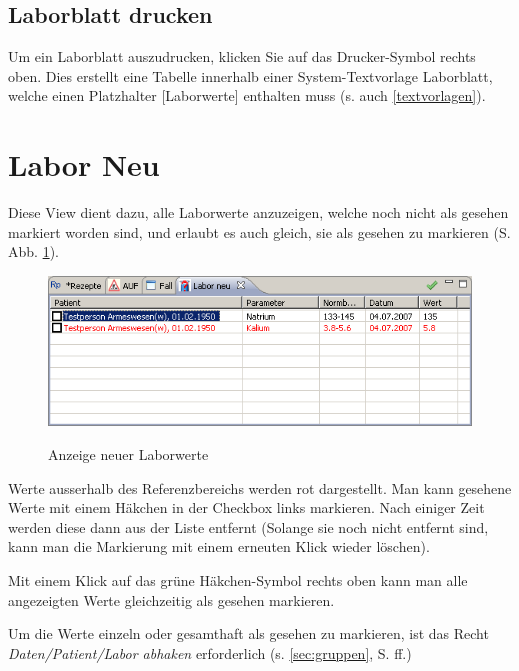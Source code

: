 \subsection{Laborblatt drucken}
Um ein Laborblatt auszudrucken, klicken Sie auf das Drucker-Symbol rechts oben. Dies erstellt eine Tabelle innerhalb einer System-Textvorlage \glqq Laborblatt\grqq{}, welche einen Platzhalter [Laborwerte] enthalten muss (s. auch \ref{textvorlagen}).

\section{Labor Neu}
Diese View dient dazu, alle Laborwerte anzuzeigen, welche noch nicht als \glqq gesehen\grqq{} markiert worden sind, und erlaubt es auch gleich, sie als gesehen zu markieren (S. Abb. \ref{fig:labneu}).

\begin{figure}
  \includegraphics{images/labneu1}\\
  \caption{Anzeige neuer Laborwerte}\label{fig:labneu}
\end{figure}

Werte ausserhalb des Referenzbereichs werden rot dargestellt. Man kann gesehene Werte mit einem Häkchen in der Checkbox links markieren. Nach einiger Zeit werden diese dann aus der Liste entfernt (Solange sie noch nicht entfernt sind, kann man die Markierung mit einem erneuten Klick wieder löschen).

Mit einem Klick auf das grüne Häkchen-Symbol rechts oben kann man alle angezeigten Werte gleichzeitig als gesehen markieren.

Um die Werte einzeln oder gesamthaft als gesehen zu markieren, ist das Recht \textit{Daten/Patient/Labor abhaken} erforderlich (s. \ref{sec:gruppen}, S. \pageref{sec:gruppen}ff.)
